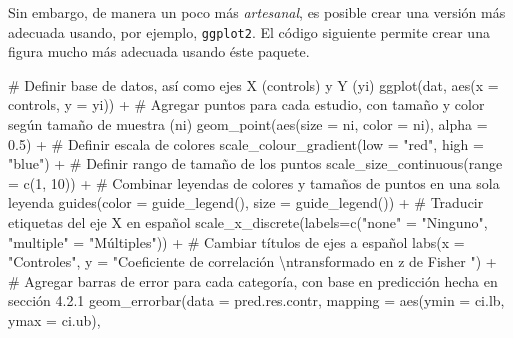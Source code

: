 \documentclass[
  bookmarksnumbered]{article}
\newenvironment{Shaded}{\begin{snugshade}}{\end{snugshade}}
\newcommand{\AttributeTok}[1]{\textcolor[rgb]{0.00,0.34,0.68}{#1}}
\newcommand{\CommentTok}[1]{\textcolor[rgb]{0.54,0.53,0.53}{#1}}
\newcommand{\DecValTok}[1]{\textcolor[rgb]{0.69,0.50,0.00}{#1}}
\newcommand{\FloatTok}[1]{\textcolor[rgb]{0.69,0.50,0.00}{#1}}
\newcommand{\FunctionTok}[1]{\textcolor[rgb]{0.39,0.29,0.61}{#1}}
\newcommand{\NormalTok}[1]{\textcolor[rgb]{0.12,0.11,0.11}{#1}}
\newcommand{\OtherTok}[1]{\textcolor[rgb]{0.00,0.43,0.16}{#1}}
\newcommand{\SpecialCharTok}[1]{\textcolor[rgb]{0.24,0.68,0.91}{#1}}
\newcommand{\StringTok}[1]{\textcolor[rgb]{0.75,0.01,0.01}{#1}}
\begin{document}
Sin embargo, de manera un poco más \emph{artesanal}, es posible crear una versión más adecuada usando, por ejemplo, \texttt{ggplot2}. El código siguiente permite crear una figura mucho más adecuada usando éste paquete.

\begin{Shaded}
\begin{Highlighting}[]
\CommentTok{\# Definir base de datos, así como ejes X (controls) y Y (yi)}
\FunctionTok{ggplot}\NormalTok{(dat, }\FunctionTok{aes}\NormalTok{(}\AttributeTok{x =}\NormalTok{ controls, }\AttributeTok{y =}\NormalTok{ yi)) }\SpecialCharTok{+}
  \CommentTok{\# Agregar puntos para cada estudio, con tamaño y color según tamaño de muestra (ni)}
  \FunctionTok{geom\_point}\NormalTok{(}\FunctionTok{aes}\NormalTok{(}\AttributeTok{size =}\NormalTok{ ni, }\AttributeTok{color =}\NormalTok{ ni),}
             \AttributeTok{alpha =} \FloatTok{0.5}\NormalTok{) }\SpecialCharTok{+}
  \CommentTok{\# Definir escala de colores}
  \FunctionTok{scale\_colour\_gradient}\NormalTok{(}\AttributeTok{low =} \StringTok{"red"}\NormalTok{,}
                        \AttributeTok{high =} \StringTok{"blue"}\NormalTok{) }\SpecialCharTok{+}
  \CommentTok{\# Definir rango de tamaño de los puntos}
  \FunctionTok{scale\_size\_continuous}\NormalTok{(}\AttributeTok{range =} \FunctionTok{c}\NormalTok{(}\DecValTok{1}\NormalTok{, }\DecValTok{10}\NormalTok{)) }\SpecialCharTok{+}
  \CommentTok{\# Combinar leyendas de colores y tamaños de puntos en una sola leyenda}
  \FunctionTok{guides}\NormalTok{(}\AttributeTok{color =} \FunctionTok{guide\_legend}\NormalTok{(), }
         \AttributeTok{size =} \FunctionTok{guide\_legend}\NormalTok{()) }\SpecialCharTok{+}
  \CommentTok{\# Traducir etiquetas del eje X en español}
  \FunctionTok{scale\_x\_discrete}\NormalTok{(}\AttributeTok{labels=}\FunctionTok{c}\NormalTok{(}\StringTok{"none"} \OtherTok{=} \StringTok{"Ninguno"}\NormalTok{, }
                            \StringTok{"multiple"} \OtherTok{=} \StringTok{"Múltiples"}\NormalTok{)) }\SpecialCharTok{+}
  \CommentTok{\# Cambiar títulos de ejes a español}
  \FunctionTok{labs}\NormalTok{(}\AttributeTok{x =} \StringTok{"Controles"}\NormalTok{, }
       \AttributeTok{y =} \StringTok{"Coeficiente de correlación }\SpecialCharTok{\textbackslash{}n}\StringTok{transformado en z de Fisher "}\NormalTok{) }\SpecialCharTok{+}
  \CommentTok{\# Agregar barras de error para cada categoría, con base en predicción hecha en sección 4.2.1}
  \FunctionTok{geom\_errorbar}\NormalTok{(}\AttributeTok{data =}\NormalTok{ pred.res.contr,}
                \AttributeTok{mapping =} \FunctionTok{aes}\NormalTok{(}\AttributeTok{ymin =}\NormalTok{ ci.lb, }\AttributeTok{ymax =}\NormalTok{ ci.ub),}

\end{Highlighting}
\end{Shaded}
\end{document}
